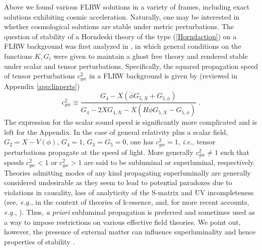 \documentclass[amsmath,amssymb,11pt]{article}
\newcommand{\beq}{\begin{equation}}
\newcommand{\eeq}{\end{equation}}
\begin{document}
Above we found various FLRW solutions in a variety of frames, including exact solutions exhibiting cosmic acceleration. Naturally, one may be interested in whether cosmological solutions are stable under metric perturbations.  The question of stability of a Horndeski theory of the type (\ref{Horndaction}) on a FLRW background was first analyzed in \cite{DeFelice:2011bh}, in which general conditions on the functions $K,G_{i}$ were given to maintain a ghost free theory and rendered stable under scalar and tensor perturbations. Specifically, the squared propagation speed of tensor perturbations $c_{gw}^{2}$ in a FLRW background is given by (reviewed in Appendix \ref{app:linperts})  
\beq c^{2}_{gw}\equiv\frac{G_{4}-X(\ddot{\phi}G_{5,X}+G_{5,\phi})}{G_{4}-2XG_{4,X}-X(H\dot{\phi}G_{5,X}-G_{5,\phi})}\;.\label{eq:gwspeedgen}\eeq
The expression for the scalar sound speed is significantly more complicated and is left for the Appendix. In the case of general relativity plus a scalar field, $G_{2}=X-V(\phi)$, $G_{4}=1$, $G_{3}=G_{5}=0$, one has $c_{gw}^{2}=1$, \emph{i.e.}, tensor perturbations propagate at the speed of light. More generally $c_{gw}^{2}\neq1$ such that speeds $c_{gw}^{2}<1$ or $c^{2}_{gw}>1$ are said to be subluminal or superluminal, respectively. Theories admitting modes of any kind propagating superluminally are generally considered undesirable as they seem to lead to potential paradoxes due to violations in causality, loss of analyticity of the S-matrix and UV incompleteness (see, \emph{e.g.}, \cite{Adams:2006sv,Shore:2007um} in the context of theories of k-essence, and, for more recent accounts, \emph{e.g.}, \cite{Dobre:2017pnt,deRham:2021fpu}). Thus, \emph{a priori} subluminal propagation is preferred and sometimes used as a way to impose restrictions on various effective field theories. We point out, however, the presence of external matter can influence superluminality and hence properties of stability \cite{Easson:2013bda}.
\end{document}
